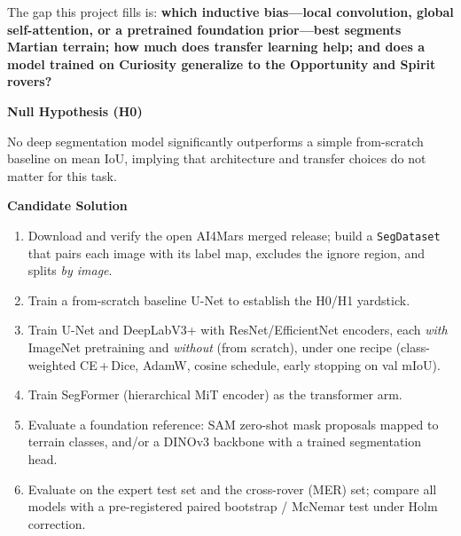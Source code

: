 \documentclass[11pt]{article}
\newcommand{\hdr}[1]{\medskip\noindent\textbf{#1}\par\nopagebreak}
\begin{document}
\smallskip\noindent The gap this project fills is: \textbf{which inductive bias---local convolution,
global self-attention, or a pretrained foundation prior---best segments Martian terrain; how much
does transfer learning help; and does a model trained on Curiosity generalize to the Opportunity and
Spirit rovers?}

\hdr{Null Hypothesis (H0)}
No deep segmentation model significantly outperforms a simple from-scratch baseline on mean IoU,
implying that architecture and transfer choices do not matter for this task.

\hdr{Candidate Solution}
\begin{enumerate}
  \item Download and verify the open AI4Mars merged release; build a \texttt{SegDataset} that pairs
  each image with its label map, excludes the ignore region, and splits \emph{by image}.
  \item Train a from-scratch baseline U-Net to establish the H0/H1 yardstick.
  \item Train U-Net and DeepLabV3+ with ResNet/EfficientNet encoders, each \emph{with} ImageNet
  pretraining and \emph{without} (from scratch), under one recipe (class-weighted CE\,+\,Dice, AdamW,
  cosine schedule, early stopping on val mIoU).
  \item Train SegFormer (hierarchical MiT encoder) as the transformer arm.
  \item Evaluate a foundation reference: SAM zero-shot mask proposals mapped to terrain classes,
  and/or a DINOv3 backbone with a trained segmentation head.
  \item Evaluate on the expert test set and the cross-rover (MER) set; compare all models with a
  pre-registered paired bootstrap / McNemar test under Holm correction.
\end{enumerate}
\end{document}
